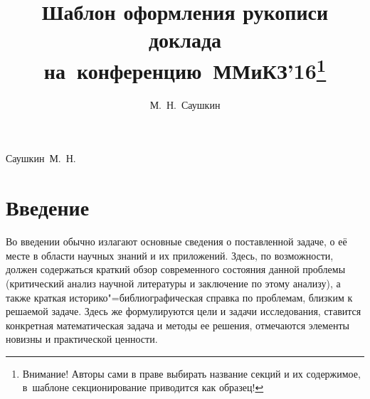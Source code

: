 \documentclass[10pt,twoside,book,a5paper]{ncc}
\begin{document}

\title{Шаблон оформления рукописи доклада на~конференцию~ММиКЗ'16\protect\footnote{\color{red}Внимание! Авторы сами в праве выбирать название секций и их содержимое, в~шаблоне секционирование приводится как образец!}}

\author{М.~Н.~Саушкин}{Саушкин~М.~Н.}

\maketitle	



\section*{Введение}

Во введении обычно излагают основные сведения о поставленной задаче, о её месте в области научных знаний и их приложений. 
Здесь, по возможности, должен содержаться краткий обзор современного состояния данной проблемы (критический анализ научной литературы и заключение по этому анализу), а также краткая историко"=библиографическая справка по проблемам, близким к решаемой задаче. 
Здесь же формулируются цели и задачи исследования, ставится конкретная математическая задача и методы ее решения, отмечаются элементы новизны и практической ценности. 
\end{document}
